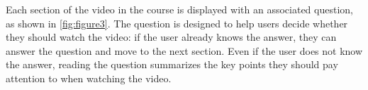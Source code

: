 \documentclass{chi-ext}
\begin{document}
Each section of the video in the course is displayed with an associated question, as shown in \autoref{fig:figure3}. The question is designed to help users decide whether they should watch the video: if the user already knows the answer, they can answer the question and move to the next section. Even if the user does not  know the answer, reading the question summarizes the key points they should pay attention to when watching the video.




\end{document}
